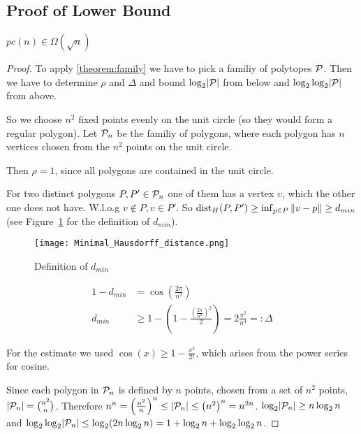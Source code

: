 \subsection{Proof of Lower Bound}

\begin{corollary}\label{corollary:lower-bound}
  $pc(n) \in \Omega(\sqrt{n})$
\end{corollary}
\begin{proof}
  To apply \ref{theorem:family} we have to pick a familiy of polytopes $\P$. Then we have to determine $\rho$ and $\Delta$ and bound $\log_2 \abs{\P}$ from below and $\log_2 \log_2 \abs{\P}$ from above.

  So we choose $n^2$ fixed points evenly on the unit circle (so they would form a regular polygon). Let $\P_n$ be the familiy of polygons, where each polygon has $n$ vertices chosen from the $n^2$ points on the unit circle.

  Then $\rho = 1$, since all polygons are contained in the unit circle.

  For two distinct polygons $P, P' \in \P_n$ one of them has a vertex $v$, which the other one does not have. W.l.o.g $v \notin P, v \in P'$. So $\dist_H(P,P') \geq \inf_{p \in P} \norm{v-p} \geq d_{min}$ (see Figure~\ref{fig:distance} for the definition of $d_{min}$).

  \begin{figure}[h]
    \centering
    \texttt{[image: Minimal\_Hausdorff\_distance.png]}
    \caption{Definition of $d_{min}$}
    \label{fig:distance}
  \end{figure}

  \begin{align*}
    1 - d_{min} &= \cos\left( \frac{2 \pi}{n^2} \right)\\
    d_{min} &\geq 1 - \left(1 - \frac{\left(\frac{2 \pi}{n^2}\right)^2}{2} \right) = 2 \frac{\pi^2}{n^4} =: \Delta
  \end{align*}

  For the estimate we used $\cos(x) \geq 1 - \frac{x^2}{2!}$, which arises from the power series for cosine.

  Since each polygon in $\P_n$ is defined by $n$ points, chosen from a set of $n^2$ points, $\abs{\P_n} = \binom{n^2}{n}$. Therefore $n^n = \left( \frac{n^2}{n} \right)^n \leq \abs{\P_n} \leq \left( n^2 \right)^n = n^{2n}$. $\log_2 \abs{\P_n} \geq n \log_2 n$ and $\log_2 \log_2 \abs{\P_n} \leq \log_2 (2n \log_2 n) = 1 + \log_2 n + \log_2 \log_2 n$.


\end{proof}
